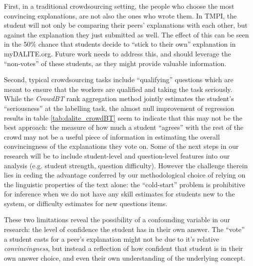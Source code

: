 \documentclass[notitlepage,12pt]{jedm}
\begin{document}
First, in a traditional crowdsourcing setting, the people who choose the most 
convincing explanations, are not also the ones who wrote them.
In TMPI, the student will not only be comparing their peers' explanations with 
each other, but against the explanation they just submitted as well.
The effect of this can be seen in the 50\% chance that students decide to 
``stick to their own'' explanation in myDALITE.org.
Future work needs to address this, and should leverage the ``non-votes'' of 
these students, as they might provide valuable information. 

Second, typical crowdsourcing tasks include ``qualifying'' questions which are 
meant to ensure that the workers are qualified and taking the task seriously.
While the \textit{CrowdBT} rank aggregation method jointly estimates the 
student's ``seriousness'' at the labelling task, the almost null improvement of 
regression results in table \ref{tab:dalite_crowdBT} seem to indicate that this 
may not be the best approach: the measure of how much a student ``agrees'' with 
the rest of the crowd may not be a useful piece of information in estimating 
the overall convincingness  of the explanations they vote on.
Some of the next steps in our research will be to include student-level and 
question-level features into our analysis (e.g. student strength, question 
difficulty).
However the challenge therein lies in ceding the advantage conferred by our 
methodological choice of relying on the linguistic properties of the text 
alone: the ``cold-start'' problem is prohibitive for inference when we do 
not have any skill estimates for students new to the system, or difficulty 
estimates for new questions items.

These two limitations reveal the possibility of a confounding variable in our 
research: the level of confidence the student has in their own answer. 
The ``vote'' a student casts for a peer's explanation might not be due to it's 
relative \textit{convincingness}, but instead a reflection of how confident 
that student is in their own answer choice, and even their own understanding of 
the underlying concept. 
\end{document}
